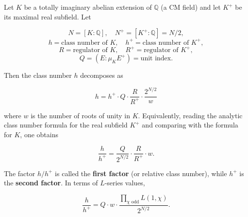 Let $K$ be a totally imaginary abelian extension of $\mathbb{Q}$ (a CM field) and let $K^+$ be its maximal real subfield. Let

$$N = [K : \mathbb{Q}], \quad N^+ = [K^+ : \mathbb{Q}] = N/2,$$
$$h = \text{class number of } K, \quad h^+ = \text{class number of } K^+,$$
$$R = \text{regulator of } K, \quad R^+ = \text{regulator of } K^+,$$
$$Q = \left( E : \mu_K E^+ \right) = \text{unit index}.$$

Then the class number $h$ decomposes as

$$h = h^+ \cdot Q \cdot \frac{R}{R^+} \cdot \frac{2^{N/2}}{w}$$

where $w$ is the number of roots of unity in $K$. Equivalently, reading the analytic class number formula for the real subfield $K^+$ and comparing with the formula for $K$, one obtains

$$\frac{h}{h^+} = \frac{Q}{2^{N/2}} \cdot \frac{R}{R^+} \cdot w.$$

The factor $h/h^+$ is called the \textbf{first factor} (or relative class number), while $h^+$ is the \textbf{second factor}. In terms of $L$-series values,

$$\frac{h}{h^+} = Q \cdot w \cdot \frac{\prod_{\chi \text{ odd}} L(1, \chi)}{2^{N/2}}.$$
